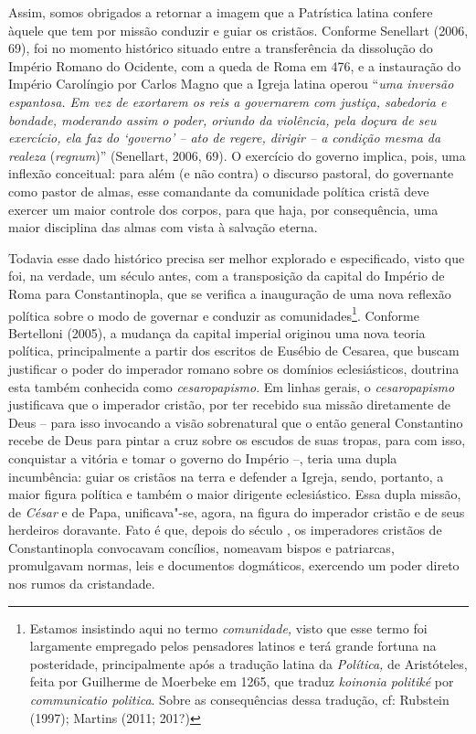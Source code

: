 Assim, somos obrigados a retornar a imagem que a Patrística latina
confere àquele que tem por missão conduzir e guiar os cristãos. Conforme
Senellart (2006, 69), foi no momento histórico situado entre a
transferência da dissolução do Império Romano do Ocidente, com a queda
de Roma em 476, e a instauração do Império Carolíngio por Carlos Magno
que a Igreja latina operou ``\emph{uma inversão espantosa. Em vez de
exortarem os reis a governarem com justiça, sabedoria e bondade,
moderando assim o poder, oriundo da violência, pela doçura de seu
exercício, ela faz do `governo' -- ato de regere, dirigir -- a condição
mesma da realeza} (\emph{regnum})'' (Senellart, 2006, 69). O exercício
do governo implica, pois, uma inflexão conceitual: para além (e não
contra) o discurso pastoral, do governante como pastor de almas, esse
comandante da comunidade política cristã deve exercer um maior controle
dos corpos, para que haja, por consequência, uma maior disciplina das
almas com vista à salvação eterna.

Todavia esse dado histórico precisa ser melhor explorado e especificado,
visto que foi, na verdade, um século antes, com a transposição da
capital do Império de Roma para Constantinopla, que se verifica a
inauguração de uma nova reflexão política sobre o modo de governar e
conduzir as comunidades\footnote{Estamos insistindo aqui no termo
  \emph{comunidade,} visto que esse termo foi largamente empregado pelos
  pensadores latinos e terá grande fortuna na posteridade,
  principalmente após a tradução latina da \emph{Política,} de
  Aristóteles, feita por Guilherme de Moerbeke em 1265, que traduz
  \emph{koinonia politiké} por \emph{communicatio politica}. Sobre as
  consequências dessa tradução, cf: Rubstein (1997); Martins (2011;
  201?)}. Conforme Bertelloni (2005), a mudança da capital imperial
originou uma nova teoria política, principalmente a partir dos escritos
de Eusébio de Cesarea, que buscam justificar o poder do imperador romano
sobre os domínios eclesiásticos, doutrina esta também conhecida como
\emph{cesaropapismo}. Em linhas gerais, o \emph{cesaropapismo}
justificava que o imperador cristão, por ter recebido sua missão
diretamente de Deus -- para isso invocando a visão sobrenatural que o
então general Constantino recebe de Deus para pintar a cruz sobre os
escudos de suas tropas, para com isso, conquistar a vitória e tomar o
governo do Império --, teria uma dupla incumbência: guiar os cristãos na
terra e defender a Igreja, sendo, portanto, a maior figura política e
também o maior dirigente eclesiástico. Essa dupla missão, de
\emph{César} e de Papa, unificava"-se, agora, na figura do imperador
cristão e de seus herdeiros doravante. Fato é que, depois do século ,
os imperadores cristãos de Constantinopla convocavam concílios, nomeavam
bispos e patriarcas, promulgavam normas, leis e documentos dogmáticos,
exercendo um poder direto nos rumos da cristandade.

